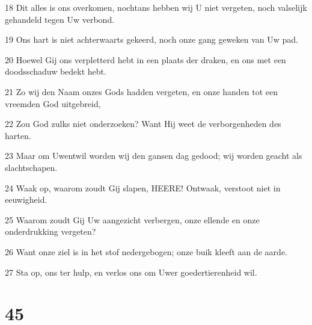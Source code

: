 \par 18 Dit alles is ons overkomen, nochtans hebben wij U niet vergeten, noch valselijk gehandeld tegen Uw verbond.
\par 19 Ons hart is niet achterwaarts gekeerd, noch onze gang geweken van Uw pad.
\par 20 Hoewel Gij ons verpletterd hebt in een plaats der draken, en ons met een doodsschaduw bedekt hebt.
\par 21 Zo wij den Naam onzes Gods hadden vergeten, en onze handen tot een vreemden God uitgebreid,
\par 22 Zou God zulks niet onderzoeken? Want Hij weet de verborgenheden des harten.
\par 23 Maar om Uwentwil worden wij den gansen dag gedood; wij worden geacht als slachtschapen.
\par 24 Waak op, waarom zoudt Gij slapen, HEERE! Ontwaak, verstoot niet in eeuwigheid.
\par 25 Waarom zoudt Gij Uw aangezicht verbergen, onze ellende en onze onderdrukking vergeten?
\par 26 Want onze ziel is in het stof nedergebogen; onze buik kleeft aan de aarde.
\par 27 Sta op, ons ter hulp, en verlos ons om Uwer goedertierenheid wil.

\chapter{45}

